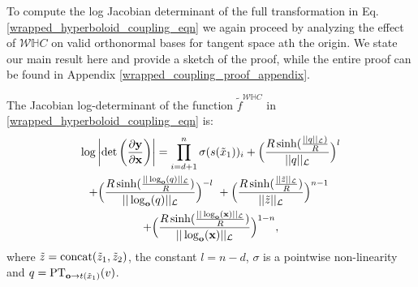 To compute the log Jacobian determinant of the full transformation in Eq. \ref{wrapped_hyperboloid_coupling_eqn} we again proceed by analyzing the effect of $\mathcal{W}\mathbb{H}C$ on valid orthonormal bases for tangent space ath the origin. We state our main result here and provide a sketch of the proof, while the entire proof can be found in Appendix \ref{wrapped_coupling_proof_appendix}. 
\begin{prop}
The Jacobian log-determinant of the function $\tilde{f}^{\mathcal{W}\mathbb{H}C}$ in \eqref{wrapped_hyperboloid_coupling_eqn} is:
\begin{multline}
  \log \left|\textnormal{det}\left(\frac{\partial\mb{y}}{\partial \mb{x}}\right)\right| = \prod_{i=d+1}^n\sigma(s(\tilde{x}_1))_i + \Big(\frac{R \sinh(\frac{||q||_{\mathcal{L}})}{R}}{||q||_{\mathcal{L}}}\Big)^{l} \\
  + \Big(\frac{R\sinh(\frac{||\log_{\textbf{o}}(q)||_{\mathcal{L}}}{R})}{||\log_{\textbf{o}}(q)||_{\mathcal{L}}}\Big)^{-l} \ +  \Big(\frac{R\sinh(\frac{||\tilde{z}||_{\mathcal{L}}}{R})}{||\tilde{z}||_{\mathcal{L}}}\Big)^{n-1}
 \  \\ + \Big(\frac{R\sinh(\frac{||\log_{\textbf{o}}(\textbf{x})||_{\mathcal{L}}}{R})}{||\log_{\textbf{o}}(\textbf{x})||_{\mathcal{L}}}\Big)^{1-n},
\end{multline}
where $\tilde{z} = \textnormal{concat}(\tilde{z}_1, \tilde{z}_2)$, the constant $l = n-d$, $\sigma$ is a pointwise non-linearity 
and $q = \textnormal{PT}_{\textbf{o}\to t(\tilde{x}_1) }(v)$.
\end{prop}
